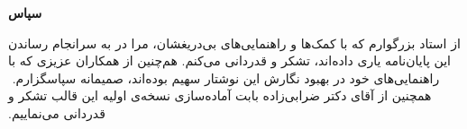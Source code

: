 


\begin{center}
	\textbf{سپاس}
\end{center}

‫از استاد بزرگوارم که با کمک‌ها و راهنمایی‌های بی‌دریغشان، مرا
‫در به سرانجام رساندن این پایان‌نامه یاری داده‌اند، تشکر و قدردانی می‌کنم.
‫هم‌چنین از همکاران عزیزی که با راهنمایی‌های خود در بهبود نگارش این نوشتار
‫سهیم بوده‌اند، صمیمانه سپاسگزارم.
‫
‫همچنین از آقای دکتر ضرابی‌زاده بابت آماده‌سازی نسخه‌ی اولیه این قالب تشکر و قدردانی می‌نماییم.
\pagebreak
